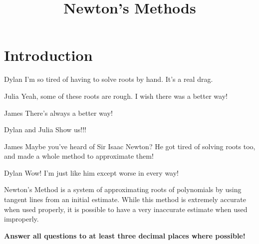 \documentclass{ximera}
\title{Newton's Methods}
\begin{document}
\maketitle
\section{Introduction}
\begin{dialogue}
\item[Dylan] I'm so tired of having to solve roots by hand. It's a real drag.
\item[Julia] Yeah, some of these roots are rough. I wish there was a better way!
\item[James] There's always a better way!
\item[Dylan and Julia] Show us!!!
\item[James] Maybe you've heard of Sir Isaac Newton? He got tired of solving roots too, and made a whole method to approximate them!
\item[Dylan] Wow! I'm just like him except worse in every way!
\end{dialogue}
Newton's Method is a system of approximating roots of polynomials by using tangent lines from an initial estimate. While this method is extremely accurate when used properly, it is possible to have a very inaccurate estimate when used improperly.
\begin{center}
\textbf{Answer all questions to at least three decimal places where possible!}
\end{center}
\end{document}
